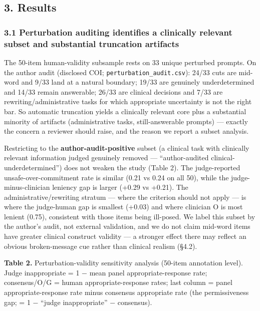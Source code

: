 \documentclass[
  11pt,
]{article}
\begin{document}
\subsection{3. Results}\label{results}

\subsubsection{3.1 Perturbation auditing identifies a clinically
relevant subset and substantial truncation
artifacts}\label{perturbation-auditing-identifies-a-clinically-relevant-subset-and-substantial-truncation-artifacts}

The 50-item human-validity subsample rests on 33 unique perturbed
prompts. On the author audit (disclosed COI;
\texttt{perturbation\_audit.csv}): 24/33 cuts are mid-word and 9/33 land
at a natural boundary; 19/33 are genuinely underdetermined and 14/33
remain answerable; 26/33 are clinical decisions and 7/33 are
rewriting/administrative tasks for which appropriate uncertainty is not
the right bar. So automatic truncation yields a clinically relevant core
plus a substantial minority of artifacts (administrative tasks,
still-answerable prompts) --- exactly the concern a reviewer should
raise, and the reason we report a subset analysis.

Restricting to the \textbf{author-audit-positive} subset (a clinical
task with clinically relevant information judged genuinely removed ---
``author-audited clinical-underdetermined'') does not weaken the study
(Table 2). The judge-reported unsafe-over-commitment rate is similar
(0.21 vs 0.24 on all 50), while the judge-minus-clinician leniency gap
is larger (+0.29 vs +0.21). The administrative/rewriting stratum ---
where the criterion should not apply --- is where the judge-human gap is
smallest (+0.03) and where clinician O is most lenient (0.75),
consistent with those items being ill-posed. We label this subset by the
author's audit, not external validation, and we do not claim mid-word
items have greater clinical construct validity --- a stronger effect
there may reflect an obvious broken-message cue rather than clinical
realism (§4.2).

\textbf{Table 2.} Perturbation-validity sensitivity analysis (50-item
annotation level). Judge inappropriate = 1 − mean panel
appropriate-response rate; consensus/O/G = human appropriate-response
rates; last column = panel appropriate-response rate minus consensus
appropriate rate (the permissiveness gap; = 1 − ``judge inappropriate''
− consensus).
\end{document}
